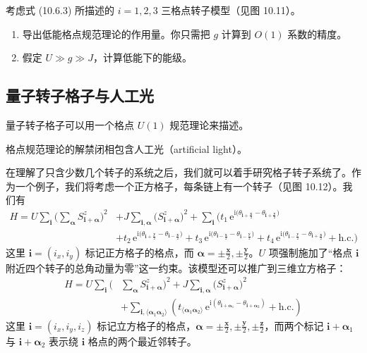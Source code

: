 考虑式 (10.6.3) 所描述的 $i=1,2,3$ 三格点转子模型（见图 10.11）。

\begin{enumerate}
\item 导出低能格点规范理论的作用量。你只需把 $g$ 计算到 $O(1)$ 系数的精度。
\item 假定 $U\gg g\gg J$，计算低能下的能级。
\end{enumerate}

\subsection{量子转子格子与人工光}

\begin{keypoints}
\item 量子转子格子可以用一个格点 $U(1)$ 规范理论来描述。
\end{keypoints}


\begin{keypoints}
\item 格点规范理论的解禁闭相包含人工光（artificial light）。
\end{keypoints}

在理解了只含少数几个转子的系统之后，我们就可以着手研究格子转子系统了。作为一个例子，我们将考虑一个正方格子，每条链上有一个转子（见图 10.12）。我们有
\begin{align*}
H=U\sum_{\pmb{i}}\Bigg(\sum_{\pmb{\alpha}}S_{\pmb{i}+\pmb{\alpha}}^{z}\Bigg)^{2}&+J\sum_{\pmb{i},\pmb{\alpha}}\big(S_{\pmb{i}+\pmb{\alpha}}^{z}\big)^{2}+\sum_{\pmb{i}}\Big(t_{1}\,\mathrm{e}^{\mathrm{i}\big(\theta_{\pmb{i}+\frac{\pmb{x}}{2}}-\theta_{\pmb{i}+\frac{\pmb{y}}{2}}\big)}\\
&+t_{2}\,\mathrm{e}^{\mathrm{i}\big(\theta_{\pmb{i}+\frac{\pmb{y}}{2}}-\theta_{\pmb{i}-\frac{\pmb{x}}{2}}\big)}+t_{3}\,\mathrm{e}^{\mathrm{i}\big(\theta_{\pmb{i}-\frac{\pmb{x}}{2}}-\theta_{\pmb{i}-\frac{\pmb{y}}{2}}\big)}+t_{4}\,\mathrm{e}^{\mathrm{i}\big(\theta_{\pmb{i}-\frac{\pmb{y}}{2}}-\theta_{\pmb{i}+\frac{\pmb{x}}{2}}\big)}+\text{h.c.}\Bigg) \tag{10.6.6}
\end{align*}
这里 $\pmb{i}=(i_x,i_y)$ 标记正方格子的格点，而 $\pmb{\alpha}=\pm\frac{\pmb{x}}{2},\pm\frac{\pmb{y}}{2}$。$U$ 项强制施加了“格点 $\pmb{i}$ 附近四个转子的总角动量为零”这一约束。该模型还可以推广到三维立方格子：
\begin{align*}
H=U\sum_{\pmb{i}}\Bigg(&\sum_{\pmb{\alpha}}S_{\pmb{i}+\pmb{\alpha}}^{z}\Bigg)^{2}+J\sum_{\pmb{i},\pmb{\alpha}}\big(S_{\pmb{i}+\pmb{\alpha}}^{z}\big)^{2}\\
&+\sum_{\pmb{i},\langle\pmb{\alpha}_1\pmb{\alpha}_2\rangle}\left(t_{\langle\pmb{\alpha}_1\pmb{\alpha}_2\rangle}\,\mathrm{e}^{\mathrm{i}(\theta_{\pmb{i}+\pmb{\alpha}_1}-\theta_{\pmb{i}+\pmb{\alpha}_2})}+\text{h.c.}\right) \tag{10.6.7}
\end{align*}
这里 $\pmb{i}=(i_x,i_y,i_z)$ 标记立方格子的格点，$\pmb{\alpha}=\pm\frac{\pmb{x}}{2},\pm\frac{\pmb{y}}{2},\pm\frac{\pmb{z}}{2}$，而两个标记 $\pmb{i}+\pmb{\alpha}_1$ 与 $\pmb{i}+\pmb{\alpha}_2$ 表示绕 $\pmb{i}$ 格点的两个最近邻转子。
